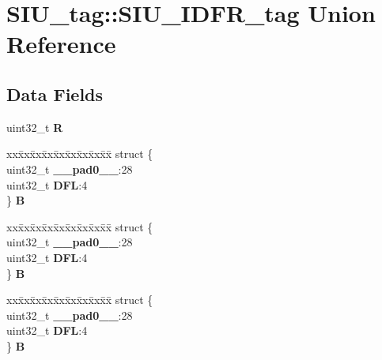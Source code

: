 \hypertarget{unionSIU__tag_1_1SIU__IDFR__tag}{}\section{S\+I\+U\+\_\+tag\+::S\+I\+U\+\_\+\+I\+D\+F\+R\+\_\+tag Union Reference}
\label{unionSIU__tag_1_1SIU__IDFR__tag}
\subsection*{Data Fields}
\begin{DoxyCompactItemize}
\item 
\mbox{\label{unionSIU__tag_1_1SIU__IDFR__tag_a11b1037099f9ffd54efd22d20d36cfdc}} 
uint32\+\_\+t {\bfseries R}
\item 
\mbox{\label{unionSIU__tag_1_1SIU__IDFR__tag_ab0dcdd82fdf24d74ce8a74b4e632ca09}} 
\begin{tabbing}
xx\=xx\=xx\=xx\=xx\=xx\=xx\=xx\=xx\=\kill
struct \{\\
\>uint32\_t {\bfseries \_\_pad0\_\_}:28\\
\>uint32\_t {\bfseries DFL}:4\\
\} {\bfseries B}\\

\end{tabbing}\item 
\mbox{\label{unionSIU__tag_1_1SIU__IDFR__tag_aa6da6411b3c644b68399611e7da455a9}} 
\begin{tabbing}
xx\=xx\=xx\=xx\=xx\=xx\=xx\=xx\=xx\=\kill
struct \{\\
\>uint32\_t {\bfseries \_\_pad0\_\_}:28\\
\>uint32\_t {\bfseries DFL}:4\\
\} {\bfseries B}\\

\end{tabbing}\item 
\mbox{\label{unionSIU__tag_1_1SIU__IDFR__tag_aaf4ff39d55b32005c34e10bf774a00da}} 
\begin{tabbing}
xx\=xx\=xx\=xx\=xx\=xx\=xx\=xx\=xx\=\kill
struct \{\\
\>uint32\_t {\bfseries \_\_pad0\_\_}:28\\
\>uint32\_t {\bfseries DFL}:4\\
\} {\bfseries B}\\


\end{tabbing}
\end{DoxyCompactItemize}
